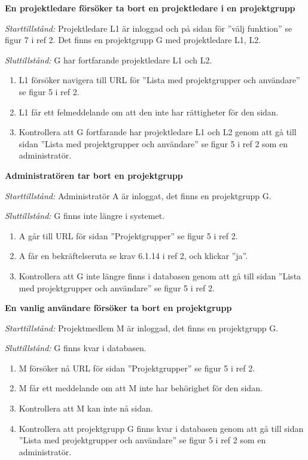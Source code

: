 \documentclass[a4paper]{article}
\begin{document}
\begin{FT}
\item %
\textbf{En projektledare försöker ta bort en projektledare i en projektgrupp}

\emph{Starttillstånd:} Projektledare L1 är inloggad och på sidan för ''välj funktion'' se figur 7 i ref 2. Det finns en projektgrupp G med projektledare L1, L2.

\emph{Sluttillstånd:} G har fortfarande projektledare L1 och L2.

\begin{enumerate}
\item L1 försöker navigera till URL för ''Lista med projektgrupper och användare'' se figur 5 i ref 2.
\item L1 får ett felmeddelande om att den inte har rättigheter för den sidan.
\item Kontrollera att G fortfarande har projektledare L1 och L2 genom att gå till sidan ''Lista med projektgrupper och användare'' se figur 5 i ref 2 som en administratör.
\end{enumerate}


\item %
\textbf{Administratören tar bort en projektgrupp}

\emph{Starttillstånd:} Administratör A är inloggat, det finns en projektgrupp G.

\emph{Sluttillstånd:} G finns inte längre i systemet.

\begin{enumerate}
\item A går till URL för sidan ''Projektgrupper'' se figur 5 i ref 2.
\item A får en bekräftelseruta se krav 6.1.14 i ref 2, och klickar ''ja''.
\item Kontrollera att G inte längre finns i databasen genom att gå till sidan ''Lista med projektgrupper och användare'' se figur 5 i ref 2.
\end{enumerate}

\item %
\textbf{En vanlig användare försöker ta bort en projektgrupp}

\emph{Starttillstånd:} Projektmedlem M är inloggad, det finns en projektgrupp G.

\emph{Sluttillstånd:} G finns kvar i databasen.

\begin{enumerate}
\item M försöker nå URL för sidan ''Projektgrupper'' se figur 5 i ref 2.
\item M får ett meddelande om att M inte har behörighet för den sidan.
\item Kontrollera att M kan inte nå sidan.
\item Kontrollera att projektgrupp G finns kvar i databasen genom att gå till sidan ''Lista med projektgrupper och användare'' se figur 5 i ref 2 som en administratör.
\end{enumerate}


\end{FT}
\end{document}

